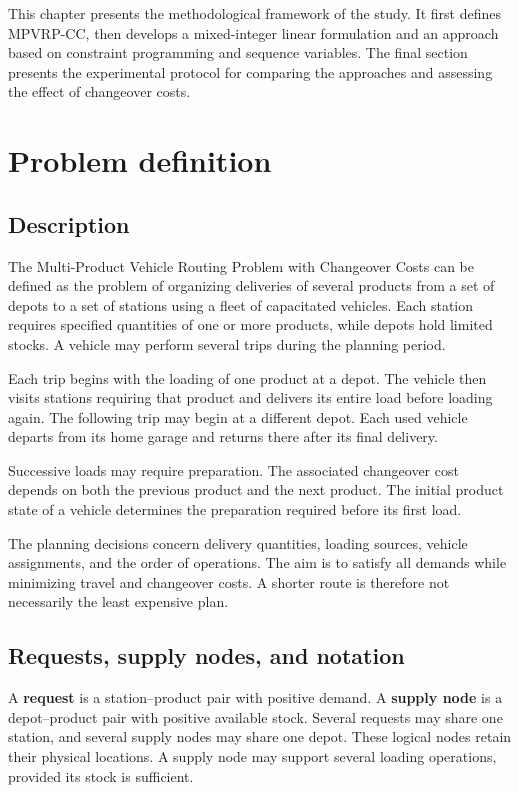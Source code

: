 This chapter presents the methodological framework of the study. It first
defines MPVRP-CC, then develops a mixed-integer linear formulation and an
approach based on constraint programming and sequence variables. The final
section presents the experimental protocol for comparing the approaches and
assessing the effect of changeover costs.

\section{Problem definition}\label{sec:problem-definition}
\subsection{Description}
The Multi-Product Vehicle Routing Problem with Changeover Costs can be defined
as the problem of organizing deliveries of several products from a set of
depots to a set of stations using a fleet of capacitated vehicles. Each station
requires specified quantities of one or more products, while depots hold
limited stocks. A vehicle may perform several trips during the planning period.

Each trip begins with the loading of one product at a depot. The vehicle then
visits stations requiring that product and delivers its entire load before
loading again. The following trip may begin at a different depot. Each used
vehicle departs from its home garage and returns there after its final delivery.

Successive loads may require preparation. The associated changeover cost
depends on both the previous product and the next product. The initial product
state of a vehicle determines the preparation required before its first load.

The planning decisions concern delivery quantities, loading sources, vehicle
assignments, and the order of operations. The aim is to satisfy all demands
while minimizing travel and changeover costs. A shorter route is therefore
not necessarily the least expensive plan.

\subsection{Requests, supply nodes, and notation}
A \textbf{request} is a station--product pair with positive demand. A
\textbf{supply node} is a depot--product pair with positive available stock.
Several requests may share one station, and several supply nodes may share
one depot. These logical nodes retain their physical locations. A supply node
may support several loading operations, provided its stock is sufficient.

